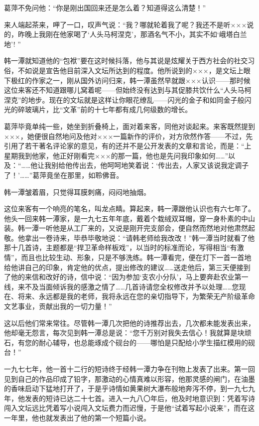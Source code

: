 \par 葛萍不免问他：“你是刚出国回来还是怎么着？知道得这么清楚！”
\par 来人端起茶来，呷了一口，叹声气说：“我？哪就轮着我了呢？我还不是听×××说的，昨晚上我刚在他家喝了‘人头马柯涅克’，那酒名气不小，其实不如‘峨塔白兰地’! ”
\par 韩一潭就知道他的“包袱”要在这时候抖落，他与其说是炫耀关于西方社会的社交习俗，不如说是宣告他目前深入文坛所达到的程度。他所说到的×××，是文坛上眼下极红的作家之一，刚从国外访问归来，韩一潭虽然早就跟×××认识——那时候这位来客还不知道跟哪儿窝着呢——但始终没有达到与其促膝共饮什么“人头马柯涅克”的地步。现在的文坛就是这样让你眼花缭乱——闪光的金子和如同金子般闪光的碎玻璃片，比“文革”前的十七年都有成几何级数的增长。
\par 葛萍毕竟单纯一些，她坐到折叠椅上，面对着来客，同他对谈起来。来客既然提到×××，她便很自然地问及他对×××一篇新作的评价，对方欣然作答——不过，先引用了若干著名评论家的意见，有的还并不是公开发表的文章和言论，而是：“上星期我到他家，他正好刚看完×××的那一篇，他也是先问我印象如何……”以及：“……他让我别给他传出去，他呵呵地笑着说：‘传出去，人家又该说我定调子了！'……”葛萍竟坐在那里，如聆佛音。
\par 韩一潭皱着眉，只觉得耳膜刺痛，闷闷地抽烟。
\par 这位来客有一个响亮的笔名，叫龙点睛。算起来，韩一潭跟他认识也有六七年了。他头一回来韩一潭家，是一九七五年年底，戴着个栽绒双耳帽，穿一身朴素的中山装。韩一潭一听他是从工厂来的，又说是刚开完支部会，便自然而然地对他肃然起敬。他拿出一卷诗来，毕恭毕敬地说：“请韩老师给我改改！”韩一潭当时就看了他那十几首诗，主题都是“捍卫革命样板戏”，以当时的标准而论，写得相当“有激情”，而且也比较生动、形象，只是不够洗练。韩一潭看完，便在灯下一首一首地给他讲自己的印象，肯定他的优点，提出修改的建议……送走他后，第三天便接到了他的来信和改好的诗，信中说：“因为参加‘支农小分队’，马上要奔赴农业第一线，来不及当面倾诉我的感激之情了……几首诗请您全权修改并予以处理……您现在、将来、永远都是我的老师，我将永远在您的亲切指导下，为繁荣无产阶级革命文艺事业，贡献出我的一切力量！”
\par 这以后他们常来常往。尽管韩一潭几次把他的诗推荐出去，几次都未能发表出来，他却毫无怨言，每次见到韩一潭总是说：“您千万别对我失去信心！我就算是块顽石，有您的耐心辅导，也总能琢成个砚台的——哪怕是只配给小学生描红模用的砚台！”
\par 一九七七年，他一首十二行的短诗终于经韩一潭力争在刊物上发表了出来。第一回见到自己的作品印成了铅字，那激动的心情真难以形容，他那灵感的闸门，在油墨的香味启动下猛地打开了，于是乎诗情如黄果树大瀑布般地奔泻不停，到一九七九年，他发表的短诗已达二十七首。进入一九八〇年后，他及时地意识到：凭着写诗闯入文坛远比凭着写小说闯入文坛费力而迟慢，于是他“试着写起小说来”，而在这一年里，他也就发表出了他的第一个短篇小说。
